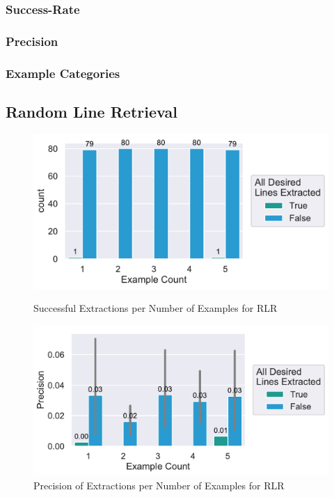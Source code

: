 \documentclass[\myrootdir/main.tex]{subfiles}
\begin{document}
\subsubsection{Success-Rate}
\subsubsection{Precision}
\subsubsection{Example Categories}


\subsection{Random Line Retrieval}

\begin{figure}[htbp]
	\centering
	\begin{minipage}{0.45\textwidth}
		\centering
		\includegraphics[width=\textwidth, clip]{img/big-study/success-examples-RLR.pdf}
		\caption{Successful Extractions per Number of Examples for RLR}
		\label{fig:success-examples-rlr}
	\end{minipage}\hfill
	\begin{minipage}{0.45\textwidth}
		\centering
		\includegraphics[width=\textwidth, clip]{img/big-study/precision-RLR.pdf}
		\caption{Precision of Extractions per Number of Examples for RLR}
		\label{fig:precision-rlr}
	\end{minipage}
\end{figure}
\end{document}
